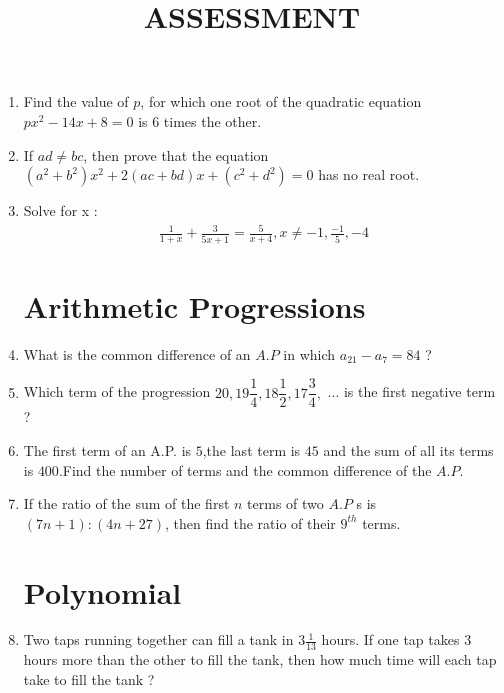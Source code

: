 \documentclass{article}
\title{ASSESSMENT}
\providecommand{\brak}[1]{\ensuremath{\left(#1\right)}}
\begin{document}
\maketitle
\begin{enumerate}

		\section{Quadratic Equations}
		    \item Find the value of $p$, for which one root of the quadratic equation $px^{2} - 14x + 8 = 0$ is $6$ times the other.

			         \item If $ad \neq bc$, then prove that the equation $\brak{a^2 + b^2}x^2 + 2\brak{ac +bd}x + \brak{c^2 + d^2} = 0 $ has no real root.

					     \item Solve for x :
						             \begin{align*}
								                 \frac{1}{1+x} + \frac{3}{5x+1} = \frac{5}{x+4} , 
										             x \neq -1, \frac{-1}{5}, -4
											             \end{align*}
												          
													  \section{Arithmetic Progressions}
													      \item What is the common difference of an $A.P$ in which $a_{21} - a_7 = 84$ ?

														           \item Which term of the progression $20,19\dfrac{1}{4},18\dfrac{1}{2},17\dfrac{3}{4},$ ... is the first negative term ?

																        \item The first term of an A.P. is $5$,the last term is $45$ and the sum of all its terms is $400$.Find the number of terms and the common difference of the $A.P$.

																		    \item If the ratio of the sum of the first $n$ terms of two $A.P$ s is $\brak{7n + 1} : \brak{4n + 27}$, then find the ratio of their $9^{th}$ terms.
																			        
																			    \section{Polynomial}
																			        \item Two taps running together can fill a tank in $3\frac{1}{13}$ hours. If one tap takes $3$ hours more than the other to fill the tank, then how much time will each tap take to fill the tank ?
																					    

\end{enumerate}
\end{document}
